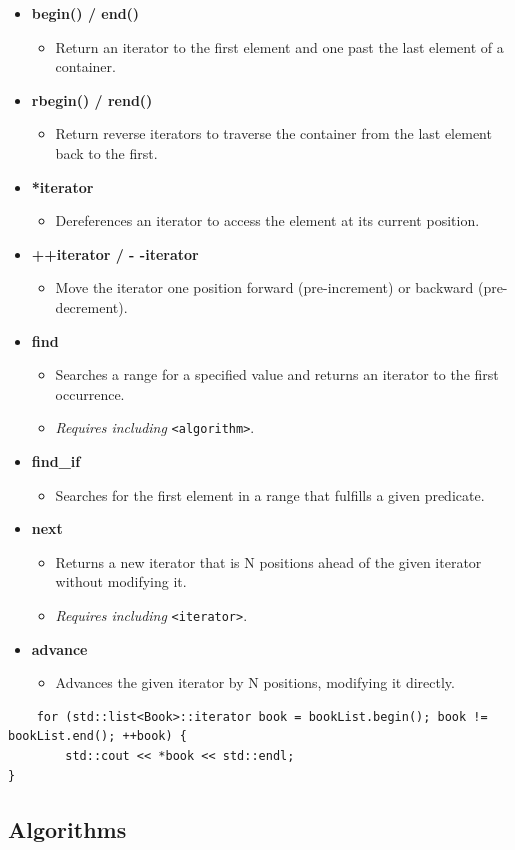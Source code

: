 \documentclass{report}
\begin{document}
\begin{itemize}
	\item \textbf{begin() / end()}
	      \begin{itemize}
		      \item Return an iterator to the first element and one past the last element of a container.
	      \end{itemize}
	\item \textbf{rbegin() / rend()}
	      \begin{itemize}
		      \item Return reverse iterators to traverse the container from the last element back to the first.
	      \end{itemize}
	\item \textbf{*iterator}
	      \begin{itemize}
		      \item Dereferences an iterator to access the element at its current position.
	      \end{itemize}
	\item \textbf{++iterator / - -iterator}
	      \begin{itemize}
		      \item Move the iterator one position forward (pre-increment) or backward (pre-decrement).
	      \end{itemize}
	\item \textbf{find}
	      \begin{itemize}
		      \item Searches a range for a specified value and returns an iterator to the first occurrence.
		      \item \textit{Requires including} \texttt{<algorithm>}.
	      \end{itemize}
	\item \textbf{find\_if}
	      \begin{itemize}
		      \item Searches for the first element in a range that fulfills a given predicate.
	      \end{itemize}
	\item \textbf{next}
	      \begin{itemize}
		      \item Returns a new iterator that is N positions ahead of the given iterator without modifying it.
		      \item \textit{Requires including} \texttt{<iterator>}.
	      \end{itemize}
	\item \textbf{advance}
	      \begin{itemize}
		      \item Advances the given iterator by N positions, modifying it directly.
	      \end{itemize}
\end{itemize}

\begin{lstlisting}
	for (std::list<Book>::iterator book = bookList.begin(); book != bookList.end(); ++book) {
		std::cout << *book << std::endl;
}
\end{lstlisting}

\subsection{Algorithms}
\end{document}
